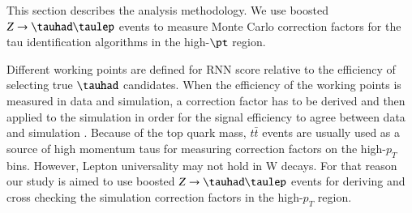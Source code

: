 This section describes the analysis methodology. We use boosted $Z\to\tauhad\taulep$ events to measure Monte Carlo correction factors for the tau identification algorithms in the high-$\pt$ region.

Different working points are defined for RNN score relative to the efficiency of selecting true $\tauhad$ candidates. When the efficiency of the working points is measured in data and simulation, a correction factor has to be derived and then applied to the simulation in order for the signal efficiency to agree between data and simulation \cite{ATLAS:2017mpa}. Because of the top quark mass, $t\bar{t}$ events are usually used as a source of high momentum taus for measuring correction factors on the high-$p_T$ bins. However, Lepton universality may not hold in W decays. For that reason our study is aimed to use boosted $Z\to\tauhad\taulep$ events for deriving and cross checking the simulation correction factors in the high-$p_T$ region.   
